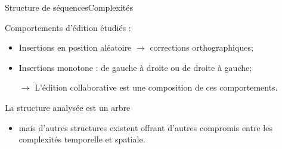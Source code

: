 \begin{frame}{Structure de séquences}{Complexités}

  \begin{minipage}{0.45\textwidth}
    \begin{center}
      
    \end{center}
  \end{minipage}
  \hfill
  \begin{minipage}{0.45\textwidth}
    \begin{center}
      
    \end{center}
  \end{minipage}

  \vspace{0.5cm}
  
  Comportements d'édition étudiés :
  \begin{itemize}
  \item Insertions en position aléatoire $\rightarrow$ corrections orthographiques;
  \item Insertions monotone : de gauche à droite ou de droite à gauche;
  \item [$\rightarrow$] L'édition collaborative est une composition de ces
    comportements.
  \end{itemize}
  

  \vspace{0.5cm}
  
  La structure analysée est un arbre 
  \begin{itemize}
  \item mais d'autres structures existent offrant d'autres compromis entre les
    complexités temporelle et spatiale.
  \end{itemize}

\end{frame}

